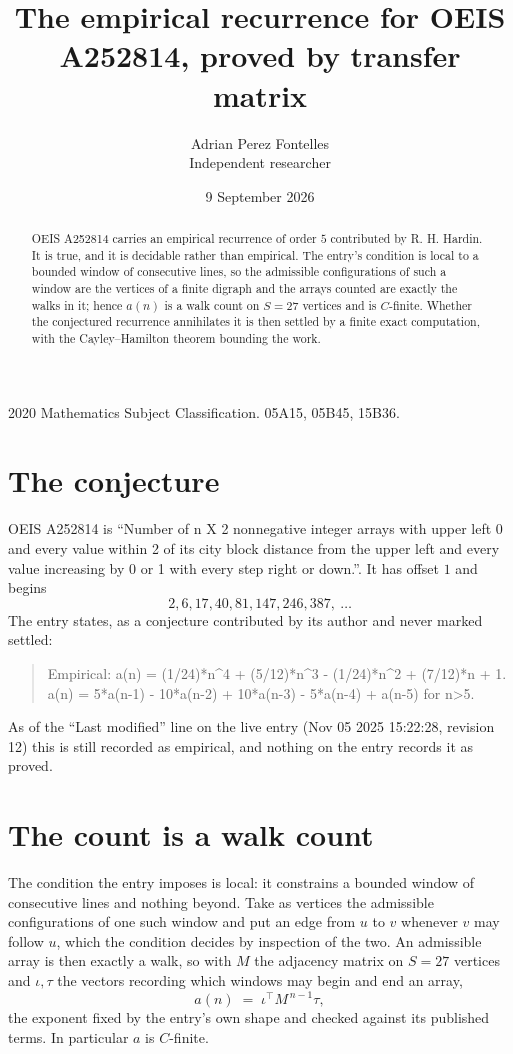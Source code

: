\documentclass[11pt,a4paper]{article}
\title{The empirical recurrence for OEIS A252814, proved by transfer matrix}
\author{Adrian Perez Fontelles\\ \small Independent researcher}
\date{9 September 2026}
\theoremstyle{plain}
\theoremstyle{definition}
\begin{document}
\maketitle

\begin{abstract}
OEIS A252814 carries an empirical recurrence of order $5$ contributed by R. H. Hardin. It is
true, and it is decidable rather than empirical. The entry's condition is local to a bounded window of consecutive lines, so
the admissible configurations of such a window are the vertices of a finite digraph and the
arrays counted are exactly the walks in it; hence $a(n)$ is a walk count on $S=27$ vertices
and is $C$-finite. Whether the conjectured recurrence annihilates it is then settled by a
finite exact computation, with the Cayley--Hamilton theorem bounding the work.
\end{abstract}

\noindent\small 2020 Mathematics Subject Classification. 05A15, 05B45, 15B36.\normalsize

\section{The conjecture}

OEIS A252814 is ``Number of n X 2 nonnegative integer arrays with upper left 0 and every value within 2 of its city block distance from the upper left and every value increasing by 0 or 1 with every step right or down.''. It has offset $1$ and begins
\[
2, 6, 17, 40, 81, 147, 246, 387,\ \dots
\]
The entry states, as a conjecture contributed by its author and never marked settled:
\begin{quote}
Empirical: a(n) = (1/24)*n\^{}4 + (5/12)*n\^{}3 - (1/24)*n\^{}2 + (7/12)*n + 1. a(n) = 5*a(n-1) - 10*a(n-2) + 10*a(n-3) - 5*a(n-4) + a(n-5) for n>5.
\end{quote}
As of the ``Last modified'' line on the live entry (Nov 05 2025 15:22:28, revision 12) this is still
recorded as empirical, and nothing on the entry records it as proved.

\section{The count is a walk count}

The condition the entry imposes is local: it constrains a bounded window of consecutive lines and nothing beyond. Take as
vertices the admissible configurations of one such window and put an edge from $u$ to $v$
whenever $v$ may follow $u$, which the condition decides by inspection of the two. An
admissible array is then exactly a walk, so with $M$ the adjacency matrix on $S=27$ vertices
and $\iota,\tau$ the vectors recording which windows may begin and end an array,
\[
a(n)\;=\;\iota^{\!\top}M^{\,n-1}\tau ,
\]
the exponent fixed by the entry's own shape and checked against its published terms. In
particular $a$ is $C$-finite.
\end{document}
